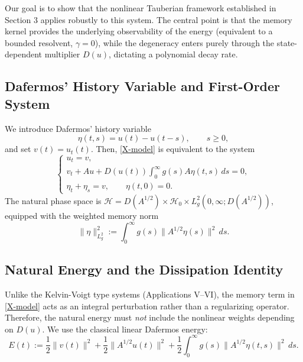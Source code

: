 \documentclass[11pt,reqno]{amsart}
\theoremstyle{remark}
\begin{document}
Our goal is to show that the nonlinear Tauberian framework established in Section 3 applies robustly to this system. The central point is that the memory kernel provides the underlying observability of the energy (equivalent to a bounded resolvent, $\gamma=0$), while the degeneracy enters purely through the state-dependent multiplier $D(u)$, dictating a polynomial decay rate.

\subsection{Dafermos' History Variable and First-Order System}

We introduce Dafermos' history \cite{Dafermos1970} variable
\[
    \eta(t,s) = u(t) - u(t-s), \qquad s \ge 0,
\]
and set $v(t) = u_t(t)$. Then, \eqref{X-model} is equivalent to the system
\begin{equation}
\begin{cases}
    u_t = v,\\[1mm]
    v_t + Au + D(u(t))\displaystyle\int_0^\infty g(s)A\eta(t,s)\,ds = 0,\\[3mm]
    \eta_t + \eta_s = v, \qquad \eta(t,0) = 0.
\end{cases}
\label{X-system}
\end{equation}
The natural phase space is $\mathcal{H} = D(A^{1/2}) \times \mathcal{H}_0 \times L_g^2(0,\infty; D(A^{1/2}))$, equipped with the weighted memory norm
\[
    \|\eta\|_{L_g^2}^2 := \int_0^\infty g(s)\|A^{1/2}\eta(s)\|^2\,ds.
\]

\subsection{Natural Energy and the Dissipation Identity}

Unlike the Kelvin-Voigt type systems (Applications V--VI), the memory term in \eqref{X-model} acts as an integral perturbation rather than a regularizing operator. Therefore, the natural energy must \emph{not} include the nonlinear weights depending on $D(u)$. We use the classical linear Dafermos energy:
\begin{equation}
    E(t) := \frac{1}{2}\|v(t)\|^2 + \frac{1}{2}\|A^{1/2}u(t)\|^2 + \frac{1}{2}\int_0^\infty g(s)\|A^{1/2}\eta(t,s)\|^2\,ds.
\label{X-energy}
\end{equation}
\end{document}
